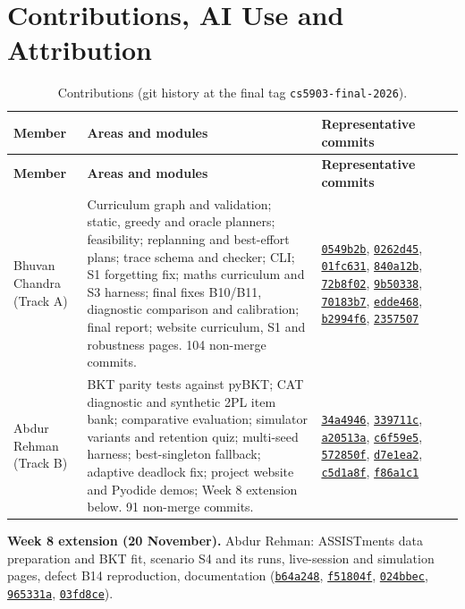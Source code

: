 \documentclass[english]{sintr}
\newcommand{\repourl}{https://github.com/Bhuvan-56/adaptive-learning-path-planner-DAT}
\newcommand{\sha}{cs5903-final-2026}
\DeclareRobustCommand{\rf}[1]{\href{\repourl/blob/\sha/#1}{\nolinkurl{#1}}}
\DeclareRobustCommand{\cm}[1]{\href{\repourl/commit/#1}{\texttt{#1}}}
\begin{document}
\section{Contributions, AI Use and Attribution}
{\small
\begin{longtable}{|L{2.47cm}|L{8.18cm}|L{4.38cm}|}
\caption{Contributions (git history at the final tag \texttt{cs5903-final-2026}).}\\
\hline
\textbf{Member} & \textbf{Areas and modules} & \textbf{Representative commits} \\ \hline
\endfirsthead
\hline \textbf{Member} & \textbf{Areas and modules} & \textbf{Representative commits} \\ \hline
\endhead
Bhuvan Chandra (Track A) & Curriculum graph and validation; static, greedy and oracle planners; feasibility; replanning and best-effort plans; trace schema and checker; CLI; S1 forgetting fix; maths curriculum and S3 harness; final fixes B10/B11, diagnostic comparison and calibration; final report; website curriculum, S1 and robustness pages. 104 non-merge commits.
& \cm{0549b2b}, \cm{0262d45}, \cm{01fc631}, \cm{840a12b}, \cm{72b8f02}, \cm{9b50338}, \cm{70183b7}, \cm{edde468}, \cm{b2994f6}, \cm{2357507} \\ \hline
Abdur Rehman (Track B) & BKT parity tests against pyBKT; CAT diagnostic and synthetic 2PL item bank; comparative evaluation; simulator variants and retention quiz; multi-seed harness; best-singleton fallback; adaptive deadlock fix; project website and Pyodide demos; Week 8 extension below. 91 non-merge commits.
& \cm{34a4946}, \cm{339711c}, \cm{a20513a}, \cm{c6f59e5}, \cm{572850f}, \cm{d7e1ea2}, \cm{c5d1a8f}, \cm{f86a1c1} \\ \hline
\end{longtable}
}
\textbf{Week 8 extension (20 November).} Abdur Rehman: ASSISTments data preparation and BKT fit, scenario S4 and its runs, live-session and simulation pages, defect B14 reproduction, documentation (\cm{b64a248}, \cm{f51804f}, \cm{024bbec}, \cm{965331a}, \cm{03fd8ce}).

\end{document}
